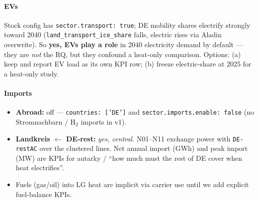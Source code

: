 \documentclass[11pt,a4paper]{article}
\begin{document}
\paragraph{EVs}
Stock config has \texttt{sector.transport: true}; DE mobility shares electrify
strongly toward 2040 (\texttt{land\_transport\_ice\_share} falls, electric rises via
Aladin overwrite). So \textbf{yes, EVs play a role} in 2040 electricity demand by
default --- they are \emph{not} the RQ, but they confound a heat-only comparison.
Options: (a) keep and report EV load as its own KPI row; (b) freeze electric-share
at 2025 for a heat-only study.

\paragraph{Imports}
\begin{itemize}[leftmargin=*]
  \item \textbf{Abroad:} off --- \texttt{countries: ['DE']} and
        \texttt{sector.imports.enable: false} (no Stromnachbarn / H$_2$ imports in v1).
  \item \textbf{Landkreis $\leftarrow$ DE-rest:} \emph{yes, central.}
        N01--N11 exchange power with \texttt{DE-restAC} over the clustered lines.
        Net annual import (GWh) and peak import (MW) are KPIs for autarky /
        ``how much must the rest of DE cover when heat electrifies''.
  \item Fuels (gas/oil) into LG heat are implicit via carrier use until we add
        explicit fuel-balance KPIs.
\end{itemize}
\end{document}
